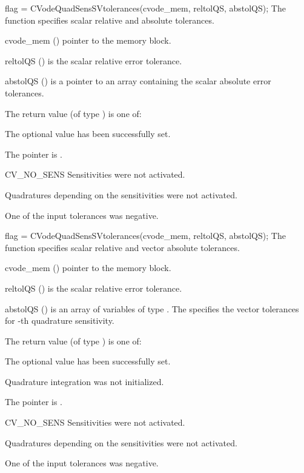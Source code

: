 {
 flag = CVodeQuadSensSVtolerances(cvode\_mem, reltolQS, abstolQS);
}
{
  The function  specifies scalar relative and absolute
  tolerances.
}
{
  \begin{args}[abstolQS]
  \item[cvode\_mem] ()
    pointer to the {\cvodes} memory block.
  \item[reltolQS] ()
    is the scalar relative error tolerance.
  \item[abstolQS] ()
    is a pointer to an array containing the  scalar absolute 
    error tolerances.
  \end{args}
}
{
  The return value  (of type ) is one of:
  \begin{args}[CV\_NO\_QUADSENS]
  \item[\Id{CV\_SUCCESS}] 
    The optional value has been successfully set.
  \item[\Id{CVODE\_MEM\_NULL}]
    The  pointer is .
  \item[CV\_NO\_SENS]
    Sensitivities were not activated.
  \item[\Id{CV\_NO\_QUADSENS}] 
    Quadratures depending on the sensitivities were not activated.
  \item[\Id{CV\_ILL\_INPUT}] 
    One of the input tolerances was negative.
  \end{args}
}
{}

{
 flag = CVodeQuadSensSVtolerances(cvode\_mem, reltolQS, abstolQS);
}
{
  The function  specifies scalar relative and 
  vector absolute tolerances.
}
{
  \begin{args}[reltolQS]
  \item[cvode\_mem] ()
    pointer to the {\cvodes} memory block.
  \item[reltolQS] ()
    is the scalar relative error tolerance.
  \item[abstolQS] ()
    is an array of  variables of type . The 
     specifies the vector tolerances for -th quadrature 
    sensitivity.
  \end{args}
}
{
  The return value  (of type ) is one of:
  \begin{args}[CV\_NO\_QUADSENS]
  \item[\Id{CV\_SUCCESS}] 
    The optional value has been successfully set.
  \item[\Id{CV\_NO\_QUAD}]
    Quadrature integration was not initialized.
  \item[\Id{CVODE\_MEM\_NULL}]
    The  pointer is .
  \item[CV\_NO\_SENS]
    Sensitivities were not activated.
  \item[\Id{CV\_NO\_QUADSENS}] 
    Quadratures depending on the sensitivities were not activated.
  \item[\Id{CV\_ILL\_INPUT}] 
    One of the input tolerances was negative.
  \end{args}
}
{}

